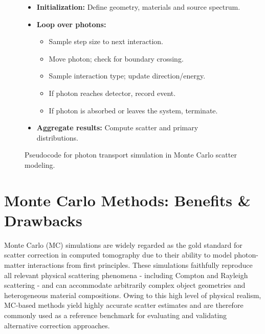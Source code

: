 \begin{figure}[H]
\centering
\begin{tcolorbox}[colback=white!95!gray, colframe=black!60, width=0.9 \textwidth, title=Monte Carlo Photon Transport Algorithm, fonttitle=\bfseries]
\begin{itemize}[leftmargin=1.5em]
    \item \textbf{Initialization:} Define geometry, materials and source
    spectrum.
    \item \textbf{Loop over photons:}
    \begin{itemize}
        \item Sample step size to next interaction.
        \item Move photon; check for boundary crossing.
        \item Sample interaction type; update direction/energy.
        \item If photon reaches detector, record event.
        \item If photon is absorbed or leaves the system, terminate.
    \end{itemize}
    \item \textbf{Aggregate results:} Compute scatter and primary distributions.
\end{itemize}
\end{tcolorbox}
\caption{Pseudocode for photon transport simulation in Monte Carlo scatter modeling.}
\label{fig:photon-transport-pseudocode}
\end{figure}


\section{Monte Carlo Methods: Benefits \& Drawbacks}

Monte Carlo (MC) simulations are widely regarded as the gold standard for
scatter correction in computed tomography due to their ability to model
photon-matter interactions from first principles. These simulations faithfully
reproduce all relevant physical scattering phenomena - including Compton and
Rayleigh scattering - and can accommodate arbitrarily complex object geometries
and heterogeneous material compositions. Owing to this high level of physical
realism, MC-based methods yield highly accurate scatter estimates and are
therefore commonly used as a reference benchmark for evaluating and validating
alternative correction approaches.

